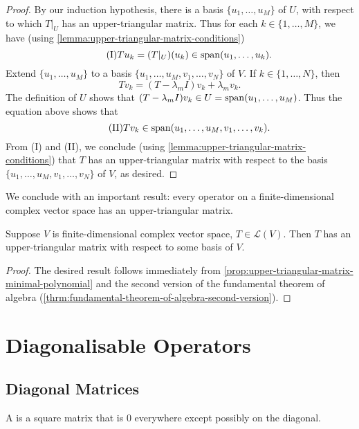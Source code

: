 \begin{proof}
By our induction hypothesis, there is a basis $\{u_1,\dots,u_M\}$ of $U$, with respect to which $T|_U$ has an upper-triangular matrix. Thus for each $k\in\{1,\dots,M\}$, we have
(using \ref{lemma:upper-triangular-matrix-conditions})
\begin{equation*}\tag{I}
Tu_k=(T|_U)(u_k)\in\operatorname{span}(u_1,\dots,u_k).
\end{equation*}
Extend $\{u_1,\dots,u_M\}$ to a basis $\{u_1,\dots,u_M,v_1,\dots,v_N\}$ of $V$. If $k\in\{1,\dots,N\}$, then
\[Tv_k=(T-\lambda_m I)v_k+\lambda_m v_k.\]
The definition of $U$ shows that $(T-\lambda_m I)v_k\in U=\operatorname{span}(u_1,\dots,u_M)$. 
Thus the equation above shows that
\begin{equation*}\tag{II}
Tv_k\in\operatorname{span}(u_1,\dots,u_M,v_1,\dots,v_k).
\end{equation*}
From (I) and (II), we conclude (using \ref{lemma:upper-triangular-matrix-conditions}) that $T$ has an upper-triangular matrix with respect to the basis $\{u_1,\dots,u_M,v_1,\dots,v_N\}$ of $V$, as desired.
\end{proof}

We conclude with an important result: every operator on a finite-dimensional complex vector space has an upper-triangular matrix.

\begin{theorem}\label{thrm:every-operator-upper-triangular-matrix}
Suppose $V$ is finite-dimensional complex vector space, $T\in\mathcal{L}(V)$. Then $T$ has an upper-triangular matrix with respect to some basis of $V$.
\end{theorem}

\begin{proof}
The desired result follows immediately from \ref{prop:upper-triangular-matrix-minimal-polynomial} and the second version of the fundamental theorem of algebra (\ref{thrm:fundamental-theorem-of-algebra-second-version}).
\end{proof}
\pagebreak

\section{Diagonalisable Operators}
\subsection{Diagonal Matrices}
\begin{definition}
A  is a square matrix that is $0$ everywhere except possibly on the diagonal.
\end{definition}

